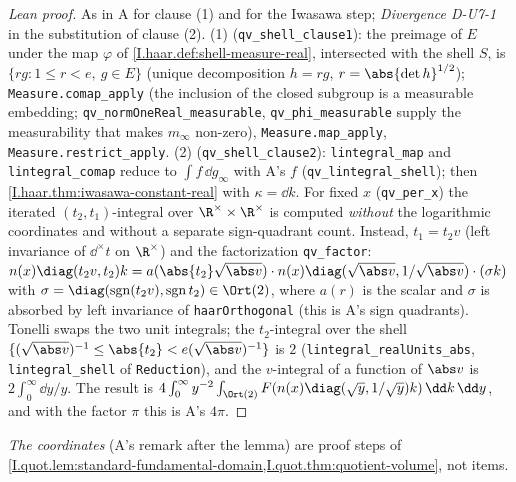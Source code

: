 \begin{proof}[Lean proof]
As in A for clause (1) and for the Iwasawa step; \emph{Divergence D-U7-1} in the substitution of clause (2). (1) (\texttt{qv\_shell\_clause1}): the preimage of $E$ under the map $\varphi$ of \cref{I.haar.def:shell-measure-real}, intersected with the shell $S$, is $\{rg:1\le r<e,\ g\in E\}$ (unique decomposition $h=rg$, $r=\abs{\det h}^{1/2}$); \texttt{Measure.comap\_apply} (the inclusion of the closed subgroup is a measurable embedding; \texttt{qv\_normOneReal\_measurable}, \texttt{qv\_phi\_measurable} supply the measurability that makes $m_\infty$ non-zero), \texttt{Measure.map\_apply}, \texttt{Measure.restrict\_apply}. (2) (\texttt{qv\_shell\_clause2}): \texttt{lintegral\_map} and \texttt{lintegral\_comap} reduce to $\int f\,\dd g_\infty$ with A's $f$ (\texttt{qv\_lintegral\_shell}); then \cref{I.haar.thm:iwasawa-constant-real} with $\kappa=\dd k$. For fixed $x$ (\texttt{qv\_per\_x}) the iterated $(t_2,t_1)$-integral over $\R^\times\times\R^\times$ is computed \emph{without} the logarithmic coordinates and without a separate sign-quadrant count. Instead, $t_1=t_2v$ (left invariance of $\dd^\times t$ on $\R^\times$) and the factorization \texttt{qv\_factor}: $n(x)\diag(t_2v,t_2)k=a(\abs{t_2}\sqrt{\abs v})\cdot n(x)\diag(\sqrt{\abs v},1/\sqrt{\abs v})\cdot(\sigma k)$ with $\sigma=\diag(\operatorname{sgn}(t_2v),\operatorname{sgn}t_2)\in\Ort(2)$, where $a(r)$ is the scalar and $\sigma$ is absorbed by left invariance of \texttt{haarOrthogonal} (this is A's sign quadrants). Tonelli swaps the two unit integrals; the $t_2$-integral over the shell $\{(\sqrt{\abs v})^{-1}\le\abs{t_2}<e(\sqrt{\abs v})^{-1}\}$ is $2$ (\texttt{lintegral\_realUnits\_abs}, \texttt{lintegral\_shell} of \texttt{Reduction}), and the $v$-integral of a function of $\abs v$ is $2\int_0^\infty\dd y/y$. The result is $4\int_0^\infty y^{-2}\int_{\Ort(2)}F(n(x)\diag(\sqrt y,1/\sqrt y)k)\,\dd k\,\dd y$, and with the factor $\pi$ this is A's $4\pi$.
\end{proof}
\noindent\emph{The coordinates} (A's remark after the lemma) are proof steps of \cref{I.quot.lem:standard-fundamental-domain,I.quot.thm:quotient-volume}, not items.

